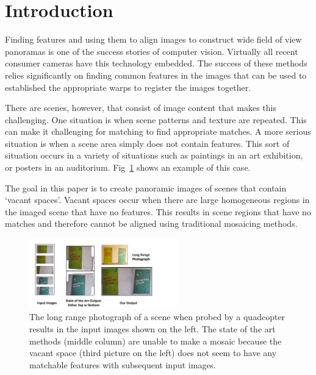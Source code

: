 \documentclass[10pt,twocolumn,letterpaper]{article}
\begin{document}
\section{Introduction}

Finding features and using them to align images to construct wide field
of view panoramas is one of the success stories of
computer vision.  Virtually all recent consumer cameras have this
technology embedded.  The success of these methods relies significantly on
finding common features in the images that can be used to established the
 appropriate warps to register the images together.

There are scenes, however, that consist of image content that makes this
challenging.  One situation is when scene patterns and texture are repeated.  
This can make it challenging for matching to find appropriate matches.
A more serious situation is when a scene area simply
does not contain features.  This sort of situation occurs in a variety
of situations such as paintings in an art exhibition, or posters in an
auditorium.  Fig~\ref{fig:teaser} shows an example of this case.

The goal in this paper is to create panoramic images of scenes that contain
`vacant spaces'.  Vacant spaces occur when there are large homogeneous regions in 
the imaged scene that have no features.   This results in scene regions that
have no matches and therefore cannot be aligned using traditional mosaicing methods.

\begin{figure}[t!]
  \centering
  \includegraphics[width=0.57\textwidth]{figures/teaser.pdf}
  \caption{ \label{fig:teaser} The long range photograph of a scene when probed
    by a quadcopter results in the input images shown on the left.  The
    state of the art methods (middle column) are unable to make a mosaic because the
    vacant space (third picture on the left) does not seem to have any
    matchable features with subsequent input images.
    }
\end{figure}
\end{document}
